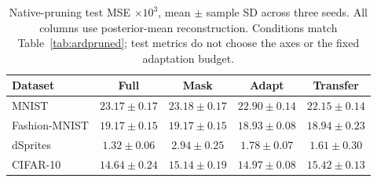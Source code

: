 \begin{table}[H]
\caption{Native-pruning test MSE $\times10^3$, mean $\pm$ sample SD across three seeds. All columns use posterior-mean reconstruction. Conditions match Table~\ref{tab:ardpruned}; test metrics do not choose the axes or the fixed adaptation budget.}\label{tab:ardprunedtest}
\small
\setlength{\tabcolsep}{3pt}
\begin{tabular*}{\textwidth}{@{\extracolsep{\fill}}lcccc@{}}
\toprule
Dataset & Full & Mask & Adapt & Transfer \\
\midrule
MNIST & $23.17 \pm 0.17$ & $23.18 \pm 0.17$ & $22.90 \pm 0.14$ & $22.15 \pm 0.14$ \\
Fashion-MNIST & $19.17 \pm 0.15$ & $19.17 \pm 0.15$ & $18.93 \pm 0.08$ & $18.94 \pm 0.23$ \\
dSprites & $1.32 \pm 0.06$ & $2.94 \pm 0.25$ & $1.78 \pm 0.07$ & $1.61 \pm 0.30$ \\
CIFAR-10 & $14.64 \pm 0.24$ & $15.14 \pm 0.19$ & $14.97 \pm 0.08$ & $15.42 \pm 0.13$ \\
\bottomrule\end{tabular*}
\end{table}
